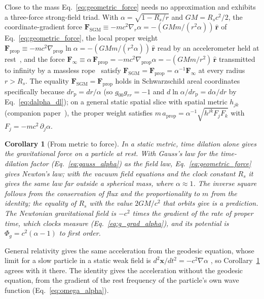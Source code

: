 \documentclass[aps,prd,onecolumn,tightenlines,nofootinbib,notitlepage,11pt,floatfix]{revtex4-2}
\theoremstyle{indentedtheorem}
\newtheorem{corollary}{Corollary}
\begin{document}
Close to the mass Eq.~\eqref{eq:geometric_force} needs no approximation and exhibits a three-force strong-field triad. With $\alpha=\sqrt{1-R_s/r}$ and $GM=R_sc^2/2$, the coordinate-gradient force $\mathbf{F}_\text{SGM}\equiv -mc^2\nabla_r\alpha = -(GMm/(r^2\alpha))\,\hat{\mathbf{r}}$ of Eq.~\eqref{eq:geometric_force}, the local proper weight $\mathbf{F}_\text{prop}\equiv -mc^2\nabla_\text{prop}\ln\alpha = -(GMm/(r^2\alpha))\,\hat{\mathbf{r}}$ read by an accelerometer held at rest~\citep{Wald1984General}, and the force $\mathbf{F}_\infty\equiv\alpha\,\mathbf{F}_\text{prop}=-mc^2\nabla_\text{prop}\alpha = -(GMm/r^2)\,\hat{\mathbf{r}}$ transmitted to infinity by a massless rope~\citep{Wald1984General} satisfy $\mathbf{F}_\text{SGM}=\mathbf{F}_\text{prop}=\alpha^{-1}\mathbf{F}_\infty$ at every radius $r>R_s$. The equality $\mathbf{F}_\text{SGM}=\mathbf{F}_\text{prop}$ holds in Schwarzschild areal coordinates specifically because $dr_\text{p}=dr/\alpha$ (so $g_{00}g_{rr}=-1$ and $d\ln\alpha/dr_\text{p}=d\alpha/dr$ by Eq.~\eqref{eq:dalpha_dl}); on a general static spatial slice with spatial metric $h_{jk}$ (companion paper~\citep{HutchisonWavefn2026}), the proper weight satisfies $m\,a_\text{prop}=\alpha^{-1}\sqrt{h^{jk}F_j F_k}$ with $F_j=-mc^2\,\partial_j\alpha$.

\begin{corollary}[From metric to force]\label{cor:causal_gravity}
In a static metric, time dilation alone gives the gravitational force on a particle at rest. With Gauss's law for the time-dilation factor (Eq.~\eqref{eq:gauss_alpha}) as the field law, Eq.~\eqref{eq:geometric_force} gives Newton's law; with the vacuum field equations and the clock constant $R_s$ it gives the same law far outside a spherical mass, where $\alpha\approx1$. The inverse square follows from the conservation of flux and the proportionality to $m$ from the identity; the equality of $R_s$ with the value $2GM/c^2$ that orbits give is a prediction. The Newtonian gravitational field is $-c^2$ times the gradient of the rate of proper time, which clocks measure (Eq.~\eqref{eq:g_grad_alpha}), and its potential is $\Phi_g=c^2(\alpha-1)$ to first order.
\end{corollary}

General relativity gives the same acceleration from the geodesic equation, whose limit for a slow particle in a static weak field is $d^2\mathbf{x}/dt^2=-c^2\nabla\alpha$ \citep{MTW1973Gravitation}, so Corollary~\ref{cor:causal_gravity} agrees with it there. The identity gives the acceleration without the geodesic equation, from the gradient of the rest frequency of the particle's own wave function (Eq.~\eqref{eq:omega_alpha}).
\end{document}
